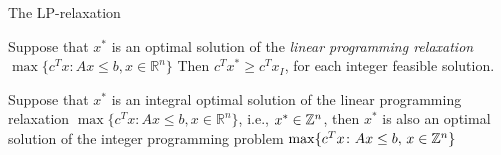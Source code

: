 \begin{frame}
  
\end{frame}

\begin{frame}{The LP-relaxation}
\begin{theorem}
  \label{thr:14}
  Suppose that   $x^*$ is an  optimal solution of the  
  \emph{linear programming 
    relaxation} $\max\{c^Tx \colon Ax\leq b, x ∈ ℝ^n\}$
  Then $c^T x^* ≥ c^T x_I$, for each integer feasible solution. 
\end{theorem}



\begin{theorem}
  \label{thr:14}
  Suppose that   $x^*$ is an integral  optimal solution of the  
  linear programming 
  relaxation $\max\{c^Tx \colon Ax\leq b, x ∈ ℝ^n\}$, i.e., $x^* \in
  \mathbb{Z}^n$, then $x^*$ is also an optimal solution of the integer
  programming problem $\max\{c^Tx \colon Ax\leq b, \, x \in \mathbb{Z}^n\}$
\end{theorem}


   \begin{columns}
    \begin{column}{.5\textwidth}
      
    \end{column}
    \begin{column}{.5\textwidth}
      
    \end{column}       
  \end{columns}
\end{frame}





